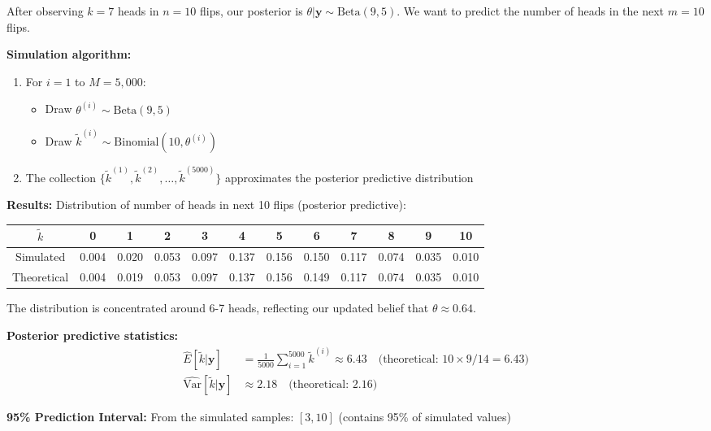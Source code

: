 \begin{examplebox}
\begin{example}
After observing $k=7$ heads in $n=10$ flips, our posterior is $\theta|\mathbf{y} \sim \text{Beta}(9,5)$. We want to predict the number of heads in the next $m=10$ flips.

\textbf{Simulation algorithm:}
\begin{enumerate}
\item For $i = 1$ to $M = 5{,}000$:
\begin{itemize}
\item Draw $\theta^{(i)} \sim \text{Beta}(9,5)$
\item Draw $\tilde{k}^{(i)} \sim \text{Binomial}(10, \theta^{(i)})$
\end{itemize}
\item The collection $\{\tilde{k}^{(1)}, \tilde{k}^{(2)}, \dots, \tilde{k}^{(5000)}\}$ approximates the posterior predictive distribution
\end{enumerate}

\textbf{Results:}
Distribution of number of heads in next 10 flips (posterior predictive):
\begin{center}
\footnotesize
\begin{tabular}{c|ccccccccccc}
\toprule
$\tilde{k}$ & 0 & 1 & 2 & 3 & 4 & 5 & 6 & 7 & 8 & 9 & 10 \\
\midrule
Simulated & 0.004 & 0.020 & 0.053 & 0.097 & 0.137 & 0.156 & 0.150 & 0.117 & 0.074 & 0.035 & 0.010 \\
Theoretical & 0.004 & 0.019 & 0.053 & 0.097 & 0.137 & 0.156 & 0.149 & 0.117 & 0.074 & 0.035 & 0.010 \\
\bottomrule
\end{tabular}
\end{center}
The distribution is concentrated around 6-7 heads, reflecting our updated belief that $\theta \approx 0.64$.

\textbf{Posterior predictive statistics:}
\begin{align*}
\hat{E}[\tilde{k}|\mathbf{y}] &= \frac{1}{5000}\sum_{i=1}^{5000} \tilde{k}^{(i)} \approx 6.43 \quad \text{(theoretical: } 10 \times 9/14 = 6.43\text{)} \\
\hat{\text{Var}}[\tilde{k}|\mathbf{y}] &\approx 2.18 \quad \text{(theoretical: } 2.16\text{)}
\end{align*}

\textbf{95\% Prediction Interval:}
From the simulated samples: $[3, 10]$ (contains 95\% of simulated values)
\end{example}
\end{examplebox}

